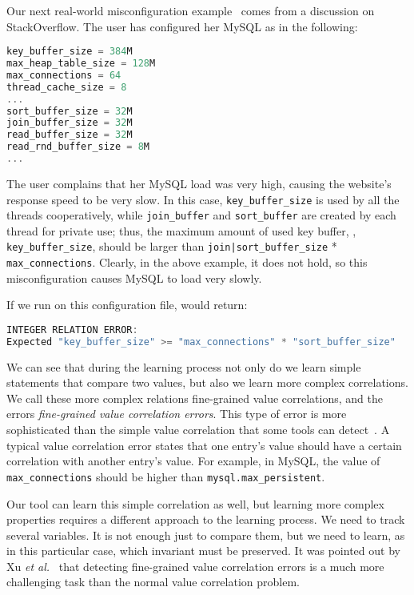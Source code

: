Our next real-world misconfiguration example~\cite{correlation} comes from a discussion on StackOverflow.
The user has configured her MySQL as in the following:

\begin{lstlisting}[language=C, xleftmargin=.01\textwidth]
key_buffer_size = 384M
max_heap_table_size = 128M
max_connections = 64
thread_cache_size = 8
...
sort_buffer_size = 32M
join_buffer_size = 32M
read_buffer_size = 32M
read_rnd_buffer_size = 8M
...
\end{lstlisting} 

The user complains that her MySQL load was very high, causing the website's
response speed to be very slow.
In this case, {\tt key\_buffer\_size} is used by all the threads
cooperatively, while {\tt join\_buffer} and {\tt sort\_buffer} are 
created by each thread for private use; thus, the maximum amount
of used key buffer, \ie, {\tt key\_buffer\_size}, should be larger than 
{\tt join|sort\_buffer\_size} * {\tt max\_connections}. 
Clearly, in the above example, it does not hold, 
so this misconfiguration causes MySQL to load very slowly.

If we run \app on this configuration file, \app  would return:

\begin{lstlisting}[language=C, xleftmargin=.01\textwidth]
INTEGER RELATION ERROR:
Expected "key_buffer_size" >= "max_connections" * "sort_buffer_size"
\end{lstlisting} 

We can see that during the learning process not only do we learn simple statements that compare two values, 
but also we learn more complex correlations. We call these more complex relations fine-grained value correlations, and the errors
\emph{fine-grained value correlation errors}. 
This type of error is more sophisticated than the simple value correlation that some tools can detect~\cite{yin11anempirical, zhang14encore}.
A typical value correlation error
states that one entry's value should have a certain correlation with
another entry's value. For example, in MySQL,
the value of {\tt max\_connections} should be higher than
{\tt mysql.max\_persistent}. 

Our tool can learn this simple correlation as well, but learning more complex properties requires a different 
approach to the learning 
process. We need to track several variables. It is not enough just to compare them, but we need to learn, as in this particular case, which
invariant must be preserved. It was pointed out by Xu {\em et al.}~\cite{xu15hey} that
detecting fine-grained value correlation errors 
is a much more challenging
task than the normal value correlation problem.

